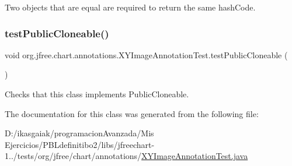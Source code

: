 Two objects that are equal are required to return the same hash\+Code. \mbox{\label{classorg_1_1jfree_1_1chart_1_1annotations_1_1_x_y_image_annotation_test_a633151bc7f2696032c8cbf7fd2809a95}} 
\subsubsection{\texorpdfstring{test\+Public\+Cloneable()}{testPublicCloneable()}}
{\footnotesize\ttfamily void org.\+jfree.\+chart.\+annotations.\+X\+Y\+Image\+Annotation\+Test.\+test\+Public\+Cloneable (\begin{DoxyParamCaption}{ }\end{DoxyParamCaption})}

Checks that this class implements Public\+Cloneable. 

The documentation for this class was generated from the following file\+:\begin{DoxyCompactItemize}
\item 
D\+:/ikasgaiak/programacion\+Avanzada/\+Mis Ejercicios/\+P\+B\+Ldefinitibo2/libs/jfreechart-\/1../tests/org/jfree/chart/annotations/\mbox{\hyperlink{_x_y_image_annotation_test_8java}{X\+Y\+Image\+Annotation\+Test.\+java}}\end{DoxyCompactItemize}
